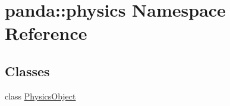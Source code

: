 \hypertarget{namespacepanda_1_1physics}{
\section{panda::physics Namespace Reference}
\label{namespacepanda_1_1physics}
}
\subsection*{Classes}
\begin{DoxyCompactItemize}
\item 
class \hyperlink{classpanda_1_1physics_1_1PhysicsObject}{PhysicsObject}
\end{DoxyCompactItemize}
